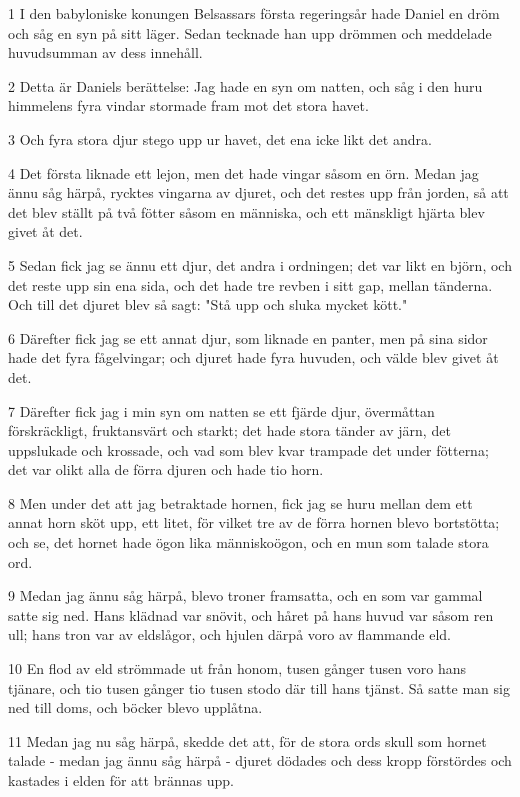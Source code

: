 \par 1 I den babyloniske konungen Belsassars första regeringsår hade Daniel en dröm och såg en syn på sitt läger. Sedan tecknade han upp drömmen och meddelade huvudsumman av dess innehåll.
\par 2 Detta är Daniels berättelse: Jag hade en syn om natten, och såg i den huru himmelens fyra vindar stormade fram mot det stora havet.
\par 3 Och fyra stora djur stego upp ur havet, det ena icke likt det andra.
\par 4 Det första liknade ett lejon, men det hade vingar såsom en örn. Medan jag ännu såg härpå, rycktes vingarna av djuret, och det restes upp från jorden, så att det blev ställt på två fötter såsom en människa, och ett mänskligt hjärta blev givet åt det.
\par 5 Sedan fick jag se ännu ett djur, det andra i ordningen; det var likt en björn, och det reste upp sin ena sida, och det hade tre revben i sitt gap, mellan tänderna. Och till det djuret blev så sagt: "Stå upp och sluka mycket kött."
\par 6 Därefter fick jag se ett annat djur, som liknade en panter, men på sina sidor hade det fyra fågelvingar; och djuret hade fyra huvuden, och välde blev givet åt det.
\par 7 Därefter fick jag i min syn om natten se ett fjärde djur, övermåttan förskräckligt, fruktansvärt och starkt; det hade stora tänder av järn, det uppslukade och krossade, och vad som blev kvar trampade det under fötterna; det var olikt alla de förra djuren och hade tio horn.
\par 8 Men under det att jag betraktade hornen, fick jag se huru mellan dem ett annat horn sköt upp, ett litet, för vilket tre av de förra hornen blevo bortstötta; och se, det hornet hade ögon lika människoögon, och en mun som talade stora ord.
\par 9 Medan jag ännu såg härpå, blevo troner framsatta, och en som var gammal satte sig ned. Hans klädnad var snövit, och håret på hans huvud var såsom ren ull; hans tron var av eldslågor, och hjulen därpå voro av flammande eld.
\par 10 En flod av eld strömmade ut från honom, tusen gånger tusen voro hans tjänare, och tio tusen gånger tio tusen stodo där till hans tjänst. Så satte man sig ned till doms, och böcker blevo upplåtna.
\par 11 Medan jag nu såg härpå, skedde det att, för de stora ords skull som hornet talade - medan jag ännu såg härpå - djuret dödades och dess kropp förstördes och kastades i elden för att brännas upp.
